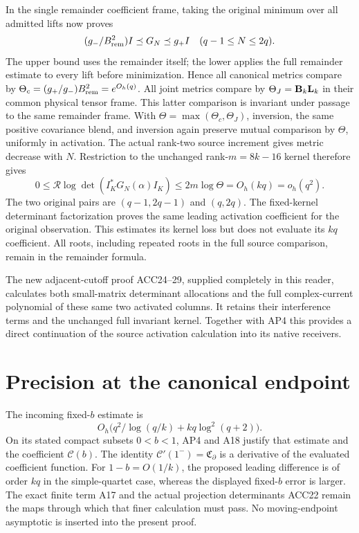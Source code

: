 \documentclass[11pt]{article}
\begin{document}
In the single remainder coefficient frame, taking the original
minimum over all admitted lifts now proves
\[
(g_-/B_{\rm rem}^2)I\preceq G_N\preceq g_+I
\quad(q-1\le N\le2q).
\]
The upper bound uses the remainder itself; the lower applies the
full remainder estimate to every lift before minimization.
Hence all canonical metrics compare by
$\Theta_c=(g_+/g_-)B_{\rm rem}^2=e^{O_h(q)}$.
All joint metrics compare by $\Theta_J={\bf B}_k{\bf L}_k$ in
their common physical tensor frame. This latter comparison is
invariant under passage to the same remainder frame.
With $\Theta=\max(\Theta_c,\Theta_J)$, inversion, the same
positive covariance blend, and inversion again preserve mutual
comparison by $\Theta$, uniformly in activation.
The actual rank-two source increment gives metric decrease with $N$.
Restriction to the unchanged rank-$m=8k-16$ kernel therefore gives
\begin{equation}\tag{AP6}
0\le\mathcal R\log\det(I_K^*G_N(\alpha)I_K)
\le2m\log\Theta=O_h(kq)=o_h(q^2).
\end{equation}
The two original pairs are $(q-1,2q-1)$ and $(q,2q)$.
The fixed-kernel determinant factorization proves the same leading
activation coefficient for the original observation.
This estimates its kernel loss but does not evaluate its $kq$
coefficient. All roots, including repeated roots in the full
source comparison, remain in the remainder formula.

The new adjacent-cutoff proof ACC24--29, supplied completely in
this reader, calculates both small-matrix determinant allocations
and the full complex-current polynomial of these same two
activated columns. It retains their interference terms and the
unchanged full invariant kernel. Together with AP4 this provides
a direct continuation of the source activation calculation into
its native receivers.

\section{Precision at the canonical endpoint}
The incoming fixed-\(b\) estimate is
\[
O_h\bigl(q^2/\log(q/k)+kq\log^2(q+2)\bigr).
\]
On its stated compact subsets \(0<b<1\), AP4 and A18 justify
that estimate and the coefficient \(\mathcal C(b)\).
The identity \(\mathcal C'(1^-)=\mathfrak C_\partial\) is a
derivative of the evaluated coefficient function. For
\(1-b=O(1/k)\), the proposed leading difference is of order
\(kq\) in the simple-quartet case, whereas the displayed
fixed-\(b\) error is larger. The exact finite term A17 and the
actual projection determinants ACC22 remain the maps through
which that finer calculation must pass. No moving-endpoint
asymptotic is inserted into the present proof.
\end{document}
